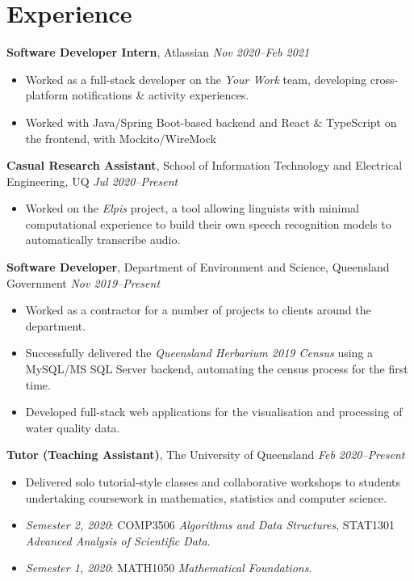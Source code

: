 \documentclass[9pt, a4paper]{extarticle}
\begin{document}
\section*{Experience}

\textbf{Software Developer Intern}, Atlassian \hfill \textit{Nov 2020--Feb 2021}
\begin{itemize}[label=\textcolor{gray!80}{\textbullet}]
    \item Worked as a full-stack developer on the \textit{Your Work} team, developing cross-platform notifications \& activity experiences.
    \item Worked with Java/Spring Boot-based backend and React \& TypeScript on the frontend, with Mockito/WireMock
\end{itemize}

\textbf{Casual Research Assistant}, School of Information Technology and Electrical Engineering, UQ \hfill \textit{Jul 2020--Present}
\begin{itemize}[label=\textcolor{gray!80}{\textbullet}]
    \item Worked on the \textit{Elpis} project, a tool allowing linguists with minimal computational experience to build their own speech recognition models to automatically transcribe audio.
\end{itemize}

\textbf{Software Developer}, Department of Environment and Science, Queensland Government \hfill \textit{Nov 2019--Present}
\begin{itemize}[label=\textcolor{gray!80}{\textbullet}]
    \item Worked as a contractor for a number of projects to clients around the department.
    \item Successfully delivered the \textit{Queensland Herbarium 2019 Census} using a MySQL/MS SQL Server backend, automating the census process for the first time.
    \item Developed full-stack web applications for the visualisation and processing of water quality data.
\end{itemize}

\textbf{Tutor (Teaching Assistant)}, The University of Queensland \hfill \textit{Feb 2020--Present}
\begin{itemize}[label=\textcolor{gray!80}{\textbullet}]
    \item Delivered solo tutorial-style classes and collaborative workshops to students undertaking coursework in mathematics, statistics and computer science.
    \item \textit{Semester 2, 2020}: COMP3506 \textit{Algorithms and Data Structures}, STAT1301 \textit{Advanced Analysis of Scientific Data}.
    \item \textit{Semester 1, 2020}: MATH1050 \textit{Mathematical Foundations}.
\end{itemize}
\end{document}
